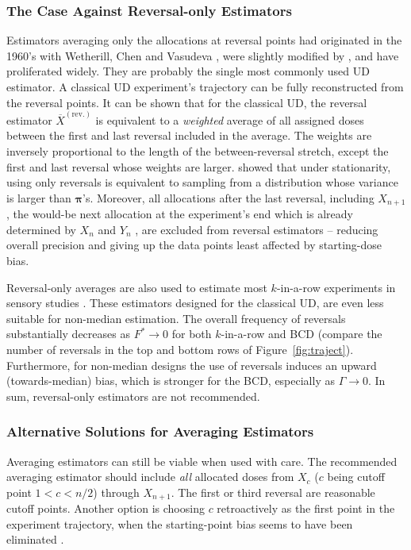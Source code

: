 \subsubsection{The Case Against Reversal-only Estimators}

Estimators averaging only the allocations at reversal points had originated in the 1960's with Wetherill, Chen and Vasudeva \citep{Weth:Chen:Vasu:est:1966}, were slightly modified by \citet{Choi:est:1971}, and have proliferated widely. They are probably the single most commonly used UD estimator. A classical UD experiment's trajectory can be fully reconstructed from the reversal points. It can be shown that for the classical UD, the reversal estimator $\overline{X}^\mathrm{(rev.)}$ is equivalent to a \emph{weighted} average of all assigned doses between the first and last reversal included in the average. The weights are inversely proportional to the length of the between-reversal stretch, except the first and last reversal whose weights are larger. \cite[Ch. 3]{Oron07} showed that under stationarity, using only reversals is equivalent to sampling from a distribution whose variance is larger than $\boldsymbol{\pi}$'s. Moreover, all allocations after the last reversal, including $X_{n+1}$, the would-be next allocation at the experiment's end which is already determined by $X_n$ and $Y_n$ \citep{BrownleeEtAl53}, are excluded from reversal estimators -- reducing overall precision and giving up the data points least affected by starting-dose bias.

Reversal-only averages are also used to estimate most $k$-in-a-row experiments in sensory studies \citep{Garc:Pere:Forc:1998}. These estimators designed for the classical UD, are even less suitable for non-median estimation. The overall frequency of reversals substantially decreases as $F^*\to 0$ for both $k$-in-a-row and BCD (compare the number of reversals in the top and bottom rows of Figure~\ref{fig:traject}). Furthermore, for non-median designs the use of reversals induces an upward (towards-median) bias, which is stronger for the BCD, especially as $\Gamma\to 0$. In sum, reversal-only estimators are not recommended.

\subsubsection{Alternative Solutions for Averaging Estimators}

Averaging estimators can still be viable when used with care. The recommended averaging estimator should include \emph{all} allocated doses from $X_c$ ($c$ being cutoff point $1<c<n/2$) through $X_{n+1}$. The first or third reversal are reasonable cutoff points. Another option is choosing $c$ retroactively as the first point in the experiment trajectory, when the starting-point bias seems to have been eliminated \citep[Section~3.3]{Oron07}.

